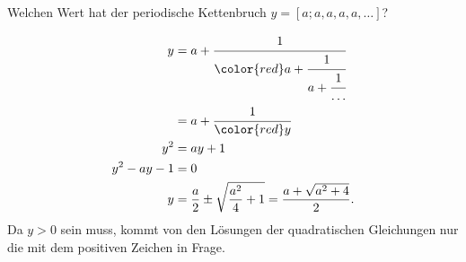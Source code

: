 Welchen Wert hat der periodische Kettenbruch 
$y=[a;a,a,a,a,\dots]$?

\begin{loesung}
\begin{align*}
y&=a+\cfrac{1}{{\color{red}a+\cfrac{1}{a+\cfrac{1}{\dots}}}}
\\
&=
a+\cfrac{1}{{\color{red}y}}
\\
y^2&=ay + 1
\\
y^2-ay-1&=0
\\
y&=\frac{a}{2}\pm\sqrt{\frac{a^2}{4}+1}
=
\frac{a+\sqrt{a^2+4}}2.
\end{align*}
Da $y>0$ sein muss, kommt von den Lösungen der quadratischen Gleichungen
nur die mit dem positiven Zeichen in Frage.
\end{loesung}

